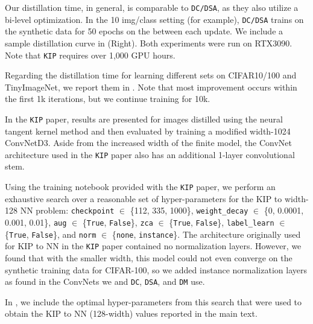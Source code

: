 \documentclass[main.tex]{subfiles}
\begin{document}
Our distillation time, in general, is comparable to \texttt{DC/DSA}, as they also utilize a bi-level optimization. In the 10 img/class setting (for example), \texttt{DC/DSA} trains on the synthetic data for 50 epochs on the between each update. We include a sample distillation curve in  (Right). Both experiments were run on RTX3090. Note that  \texttt{KIP} requires over 1,000 GPU hours.

Regarding the distillation time for learning different sets on CIFAR10/100 and TinyImageNet, we report them in . Note that most improvement occurs within the first 1k iterations, but we continue training for 10k.


In the \texttt{KIP} paper, results are presented for images distilled using the neural tangent kernel method and then evaluated by training a modified width-1024 ConvNetD3. Aside from the increased width of the finite model, the ConvNet architecture used in the \texttt{KIP} paper also has an additional 1-layer convolutional stem.

Using the training notebook provided with the \texttt{KIP} paper, we perform an exhaustive search over a reasonable set of hyper-parameters for the KIP to width-128 NN problem: \texttt{checkpoint} $\in$ \{112, 335, 1000\}, \texttt{weight\_decay} $\in $ \{0, 0.0001, 0.001, 0.01\}, \texttt{aug} $\in$ \{\texttt{True}, \texttt{False}\}, \texttt{zca} $\in$ \{\texttt{True}, \texttt{False}\}, \texttt{label\_learn} $\in$ \{\texttt{True}, \texttt{False}\}, and \texttt{norm} $\in$ \{\texttt{none}, \texttt{instance}\}. The architecture originally used for KIP to NN in the \texttt{KIP} paper contained no normalization layers. However, we found that with the smaller width, this model could not even converge on the synthetic training data for CIFAR-100, so we added instance normalization layers as found in the ConvNets we and \texttt{DC}, \texttt{DSA}, and \texttt{DM} use.

In , we include the optimal hyper-parameters from this search that were used to obtain the KIP to NN (128\nobreakdash-width) values reported in the main text.


\end{document}

